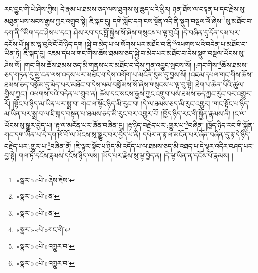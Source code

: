 རང་བྱུང་གི་ཡེ་ཤེས་ཀྱིས། དེ་རྣམ་པ་ཐམས་ཅད་ལས་ཐུགས་སུ་ཆུད་པའི་ཕྱིར། ཉན་ཐོས་ལ་བསྟན་པ་དང་རྗེས་སུ་མཐུན་པས་སངས་རྒྱས་ཀྱང་འགྲུབ་སྟེ། ཇི་སྐད་དུ། དགེ་སློང་དག་ངས་སྔོན་འདི་ནི་སྡུག་བསྔལ་ལོ་ཞེས་\footnote{«སྣར་»«པེ་»ཞེས་རྗེས་}སུ་མཐོང་བ་དག་ནི་\footnote{«སྣར་»«པེ་»ན་}མིག་དང་ཤེས་པ་དང་། ཤེས་རབ་དང་བློ་སྐྱེས་སོ་ཞེས་གསུངས་པ་ལྟ་བུའོ། །དེ་བཞིན་དུ་དོན་དམ་པར་དངོས་པོ་སྒྱུ་མ་ལྟ་བུའི་ངོ་བོ་ཉིད་དག །སྐྱེ་བ་མེད་པ་ལ་སོགས་པར་མཐོང་བ་ནི་\footnote{«སྣར་»«པེ་»ན་}འཕགས་པའི་བདེན་པ་མཐོང་བ་ཡིན་ཏེ། ཇི་སྐད་དུ། འཇམ་དཔལ་གང་གིས་ཆོས་ཐམས་ཅད་སྐྱེ་བ་མེད་པར་མཐོང་བ་དེས་སྡུག་བསྔལ་ཡོངས་སུ་ཤེས་སོ། །གང་གིས་ཆོས་ཐམས་ཅད་མི་གནས་པར་མཐོང་བ་དེས་ཀུན་འབྱུང་སྤངས་སོ། །:གང་གིས་\footnote{«སྣར་»«པེ་»གང་གི་}ཆོས་ཐམས་ཅད་གཏན་དུ་མྱ་ངན་ལས་འདས་པར་མཐོང་བ་དེས་འགོག་པ་མངོན་སུམ་དུ་བྱས་སོ། །འཇམ་དཔལ་གང་གིས་ཆོས་ཐམས་ཅད་བསྒོམ་དུ་མེད་པར་མཐོང་བ་དེས་ལམ་བསྒོམས་སོ་ཞེས་གསུངས་པ་ལྟ་བུ་སྟེ། ཐེག་པ་ཆེན་པོའི་ཚུལ་གྱིས་ཀྱང་། འཕགས་པའི་བདེན་པ་གྲུབ་ན། ཆོས་དང་སངས་རྒྱས་ཀྱང་འགྲུབ་པས་ཐམས་ཅད་ཀྱང་རུང་བར་འགྱུར་རོ། །སྟོང་པ་ཉིད་མ་ཡིན་པར་སྨྲ་བ། གང་ལ་སྟོང་ཉིད་མི་རུང་བ། །དེ་ལ་ཐམས་ཅད་མི་རུང་འགྱུར། །གང་སྟོང་པ་ཉིད་མ་ཡིན་པར་སྨྲ་བ་ལ་ཇི་སྐད་བསྟན་པ་ཐམས་ཅད་མི་རུང་བར་འགྱུར་རོ། །ཁྱོད་ཉིད་རང་གི་སྐྱོན་རྣམས་ནི། །ང་ལ་ཡོངས་སུ་སྒྱུར་བྱེད་པ། །རྟ་ལ་མངོན་པར་ཞོན་བཞིན་དུ། །རྟ་ཉིད་བརྗེད་པར་:གྱུར་པ་\footnote{«སྣར་»«པེ་»འགྱུར་བ་}བཞིན། །ཁྱོད་ཉིད་རང་གི་སྐྱོན་གང་དག་ཡིན་པ་དེ་དག་ཁོ་བོ་ལ་ཡོངས་སུ་སྒྱུར་བར་བྱེད་པ་ནི། དཔེར་ན་རྟ་ལ་མངོན་པར་ཞོན་བཞིན་དུ་རྟ་དེ་ཉིད་བརྗེད་པར་:གྱུར་པ་\footnote{«སྣར་»«པེ་»འགྱུར་བ་}བཞིན་ནོ། །ཇི་ལྟར་སྟོང་པ་ཉིད་མི་འདོད་པ་ལ་ཐམས་ཅད་མི་འཐད་པ་དེ་ལྟར་འདིར་བཤད་པར་བྱ་སྟེ། གལ་ཏེ་དངོས་རྣམས་དངོས་ཉིད་ལས། །ཡོད་པར་རྗེས་སུ་ལྟ་བྱེད་ན། །དེ་ལྟ་ཡིན་ན་དངོས་པོ་རྣམས། །
